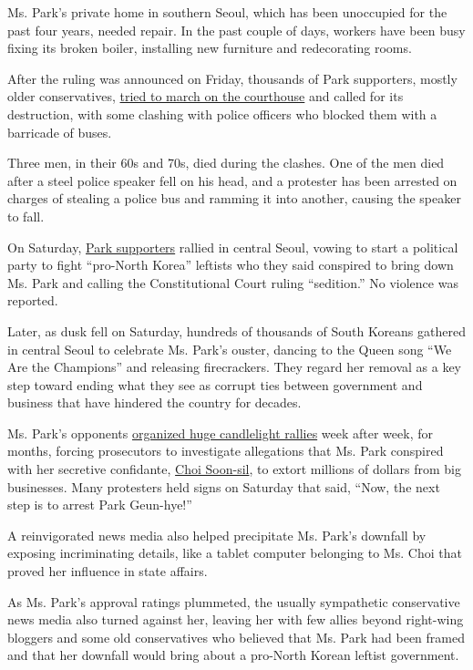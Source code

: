 Ms. Park's private home in southern Seoul, which has been unoccupied for
the past four years, needed repair. In the past couple of days, workers
have been busy fixing its broken boiler, installing new furniture and
redecorating rooms.

After the ruling was announced on Friday, thousands of Park supporters,
mostly older conservatives,
\href{https://www.nytimes.com/2017/03/10/world/asia/south-korea-president-impeached-protests.html}{tried
to march on the courthouse} and called for its destruction, with some
clashing with police officers who blocked them with a barricade of
buses.

Three men, in their 60s and 70s, died during the clashes. One of the men
died after a steel police speaker fell on his head, and a protester has
been arrested on charges of stealing a police bus and ramming it into
another, causing the speaker to fall.

On Saturday,
\href{https://www.nytimes.com/2017/02/18/world/asia/south-korea-impeached-leader-park-geun-hye.html}{Park
supporters} rallied in central Seoul, vowing to start a political party
to fight ``pro-North Korea'' leftists who they said conspired to bring
down Ms. Park and calling the Constitutional Court ruling ``sedition.''
No violence was reported.

Later, as dusk fell on Saturday, hundreds of thousands of South Koreans
gathered in central Seoul to celebrate Ms. Park's ouster, dancing to the
Queen song ``We Are the Champions'' and releasing firecrackers. They
regard her removal as a key step toward ending what they see as corrupt
ties between government and business that have hindered the country for
decades.

Ms. Park's opponents
\href{https://www.nytimes.com/2016/11/26/world/asia/korea-park-geun-hye-protests.html}{organized
huge candlelight rallies} week after week, for months, forcing
prosecutors to investigate allegations that Ms. Park conspired with her
secretive confidante,
\href{https://www.nytimes.com/2016/11/01/world/asia/south-korea-park-geun-hye-choi-soon-sil.html}{Choi
Soon-sil}, to extort millions of dollars from big businesses. Many
protesters held signs on Saturday that said, ``Now, the next step is to
arrest Park Geun-hye!''

A reinvigorated news media also helped precipitate Ms. Park's downfall
by exposing incriminating details, like a tablet computer belonging to
Ms. Choi that proved her influence in state affairs.

As Ms. Park's approval ratings plummeted, the usually sympathetic
conservative news media also turned against her, leaving her with few
allies beyond right-wing bloggers and some old conservatives who
believed that Ms. Park had been framed and that her downfall would bring
about a pro-North Korean leftist government.

